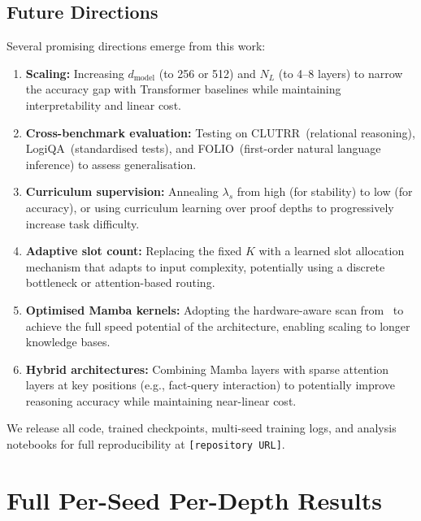 \documentclass[conference]{IEEEtran}
\begin{document}
\subsection{Future Directions}

Several promising directions emerge from this work:

\begin{enumerate}[nosep]
    \item \textbf{Scaling:} Increasing $d_{\text{model}}$ (to
          256 or 512) and $N_L$ (to 4--8 layers) to narrow the
          accuracy gap with Transformer baselines while
          maintaining interpretability and linear cost.
    \item \textbf{Cross-benchmark evaluation:} Testing on
          CLUTRR~(relational reasoning), LogiQA~(standardised
          tests), and FOLIO~(first-order natural language
          inference) to assess generalisation.
    \item \textbf{Curriculum supervision:} Annealing $\lambda_s$
          from high (for stability) to low (for accuracy), or
          using curriculum learning over proof depths to
          progressively increase task difficulty.
    \item \textbf{Adaptive slot count:} Replacing the fixed $K$
          with a learned slot allocation mechanism that adapts
          to input complexity, potentially using a discrete
          bottleneck or attention-based routing.
    \item \textbf{Optimised Mamba kernels:} Adopting the
          hardware-aware scan from~\cite{gu2023mamba} to achieve
          the full speed potential of the architecture, enabling
          scaling to longer knowledge bases.
    \item \textbf{Hybrid architectures:} Combining Mamba layers
          with sparse attention layers at key positions
          (e.g., fact-query interaction) to potentially improve
          reasoning accuracy while maintaining near-linear cost.
\end{enumerate}

We release all code, trained checkpoints, multi-seed training logs,
and analysis notebooks for full reproducibility at
\texttt{[repository URL]}.


\appendix

\section{Full Per-Seed Per-Depth Results}
\label{app:full_results}
\end{document}
